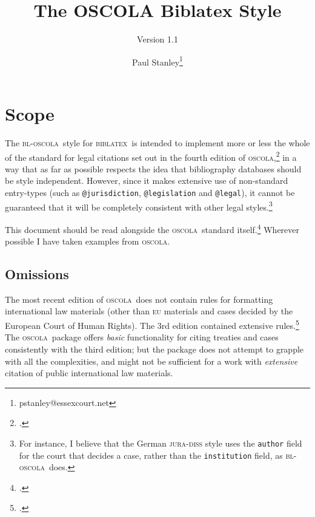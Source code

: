 \documentclass[a5paper,fontsize=9pt,DIV=1]{scrartcl}
\newcommand{\oscola}{\textsc{bl-oscola}}
\newcommand{\biblatex}{\textsc{biblatex}}
\newcommand{\oscolashort}{\textsc{oscola}\nocite{oscola}}
\begin{document}
\title{The OSCOLA Biblatex Style}
\subtitle{Version 1.1}

\author{Paul Stanley\thanks{pstanley@essexcourt.net}}

\maketitle

\tableofcontents

\section{Scope}

The \oscola\ style for \biblatex\
is intended to implement more or less the whole of the standard for
legal citations set out in the fourth edition of
\oscolashort,\footcite{oscola} in a way that as far as possible
respects the idea that bibliography databases should be style
independent. However, since it
makes extensive use of non-standard entry-types (such as
\texttt{@jurisdiction}, \texttt{@legislation} and \texttt{@legal}), it
cannot be guaranteed that it will be completely consistent with other
legal styles.\footnote{For instance, I believe that the German
  \textsc{jura-diss} style uses the \texttt{author} field for the
  court that decides a case, rather than the \texttt{institution}
  field, as \oscola\ does.}

This document should be read alongside the \oscolashort\ standard
itself.\footcite{oscola} Wherever possible I have taken examples from
\oscolashort.

\subsection{Omissions\label{scope}}

 The most
recent edition of \oscolashort\ does not contain rules for formatting
international law materials (other than \textsc{eu} materials and
cases decided by the European Court of Human Rights). The 3rd edition
contained extensive rules.\footcite[25--37]{oscola3} The \oscolashort\
package offers \emph{basic} functionality for citing treaties and cases
consistently with the third edition; but the package does not attempt
to grapple with all the complexities, and might not be sufficient for
a work with \emph{extensive} citation of public international law
materials.
\end{document}
